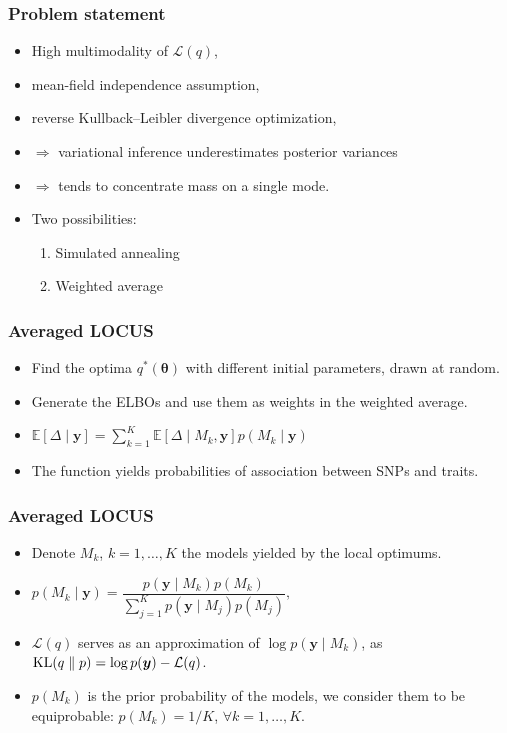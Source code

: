 \documentclass{beamer}
\DeclareMathOperator*{\KL}{{\rm KL}}
\begin{document}
\begin{frame}
\frametitle{Problem statement}
\begin{itemize}
\item High multimodality of $\mathcal{L}(q)$,
\item mean-field independence assumption,
\item reverse Kullback--Leibler divergence optimization,
\item $\Rightarrow$ variational inference underestimates posterior variances
\item $\Rightarrow$ tends to concentrate mass on a single mode.
\item Two possibilities:
\begin{enumerate}
\item Simulated annealing
\item Weighted average
\end{enumerate}
\end{itemize}
\end{frame}

\begin{frame}
\frametitle{Averaged LOCUS}
\begin{itemize}
\item Find the optima $q^*(\boldsymbol{\theta})$ with different initial parameters, drawn at random.
\item Generate the ELBOs and use them as weights in the weighted average.
\item $\mathbb{E}\left[\Delta\mid \boldsymbol{y}\right]= \sum_{k=1}^K \mathbb{E}\left[\Delta\mid M_k,\boldsymbol{y}\right]p(M_k\mid\boldsymbol{y})$
\item The function yields probabilities of association between SNPs and traits.
\end{itemize}
\end{frame}


\begin{frame}
\frametitle{Averaged LOCUS}
\begin{itemize}
\item Denote $M_k$, $k= 1,\ldots, K$ the models yielded by the local optimums.
\item $p(M_k \mid \boldsymbol{y}) = \dfrac{p(\boldsymbol{y} \mid M_k)p(M_k)}{\sum_{j=1}^{K}p(\boldsymbol{y}\mid M_j)p(M_j)},$
\item $\mathcal{L}(q)$ serves as an approximation of $\log p(\boldsymbol{y} \mid M_k)$, as $\KL(q\parallel p) = \log p(\boldsymbol{y}) - \mathcal{L}(q)$.
\item $p(M_k)$ is the prior probability of the models, we consider them to be equiprobable: $p(M_k) = 1/K$, $\forall k = 1,\ldots,K$.
\end{itemize}
\end{frame}
\end{document}
